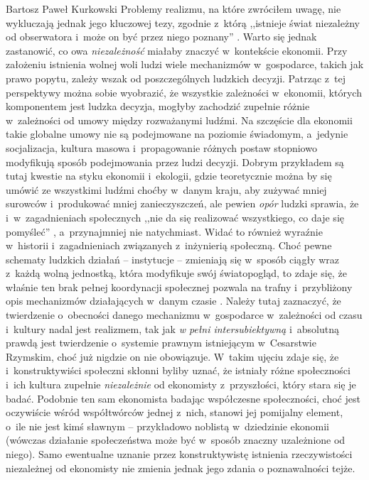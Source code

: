 \begin{artplenv}{Bartosz Paweł Kurkowski}
Problemy realizmu, na które zwróciłem uwagę, nie wykluczają jednak jego kluczowej tezy, zgodnie z~którą ,,istnieje świat
niezależny od obserwatora i~może on być przez niego poznany''
\parencite[s.~16]{hardt_studia_2013}.
Warto się
jednak zastanowić, co owa \textit{niezależność} miałaby znaczyć w~kontekście ekonomii. Przy założeniu istnienia wolnej
woli ludzi wiele mechanizmów w~gospodarce, takich jak prawo popytu, zależy wszak od poszczególnych ludzkich decyzji.
Patrząc z~tej perspektywy można sobie wyobrazić, że wszystkie zależności w~ekonomii, których komponentem jest ludzka
decyzja, mogłyby zachodzić zupełnie różnie w~zależności od umowy między rozważanymi ludźmi. Na szczęście dla ekonomii
takie globalne umowy nie są podejmowane na poziomie świadomym, a~jedynie socjalizacja, kultura masowa i~propagowanie
różnych postaw stopniowo modyfikują sposób podejmowania przez ludzi decyzji. Dobrym przykładem są tutaj kwestie na
styku ekonomii i~ekologii, gdzie teoretycznie można by się umówić ze wszystkimi ludźmi choćby w~danym kraju, aby zużywać mniej
surowców i~produkować mniej zanieczyszczeń, ale pewien \textit{opór} ludzki sprawia, że i~w~zagadnieniach społecznych
,,nie da się realizować wszystkiego, co daje się pomyśleć''
\parencite[s.~42]{zboron_teorie_2009},
a~przynajmniej nie natychmiast. Widać to również wyraźnie w~historii i~zagadnieniach związanych z~inżynierią społeczną.
Choć pewne schematy ludzkich działań -- instytucje -- zmieniają się w~sposób ciągły wraz z~każdą wolną jednostką, która
modyfikuje swój światopogląd, to zdaje się, że właśnie ten brak pełnej koordynacji społecznej pozwala na
trafny i~przybliżony opis mechanizmów działających w~danym czasie
\parencite[s.~21]{hardt_studia_2013}.
Należy
tutaj zaznaczyć, że twierdzenie o~obecności danego mechanizmu w~gospodarce w~zależności od czasu i~kultury nadal jest
realizmem, tak jak \textit{w pełni intersubiektywną} i~absolutną prawdą jest twierdzenie o~systemie prawnym istniejącym
w~Cesarstwie Rzymskim, choć już nigdzie on nie obowiązuje. W~takim ujęciu zdaje się, że i~konstruktywiści społeczni
skłonni byliby uznać, że istniały różne społeczności i~ich kultura zupełnie \textit{niezależnie} od
ekonomisty z~przyszłości, który stara się je badać.
Podobnie ten sam ekonomista badając współczesne społeczności, choć jest oczywiście wśród współtwórców
jednej z~nich, stanowi jej pomijalny element, o~ile nie jest kimś sławnym -- przykładowo noblistą w~dziedzinie ekonomii
(wówczas działanie społeczeństwa może być w~sposób znaczny uzależnione od niego).
Samo ewentualne uznanie przez konstruktywistę istnienia rzeczywistości niezależnej od
ekonomisty nie zmienia jednak jego zdania o poznawalności tejże.




\end{artplenv}
